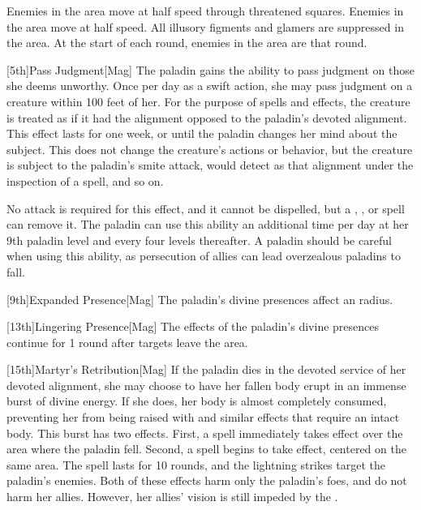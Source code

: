         Enemies in the area move at half speed through threatened squares.
        Enemies in the area move at half speed.
        All illusory figments and glamers are suppressed in the area.
        At the start of each round, enemies in the area are \immobilized that round.

        [5th]{Pass Judgment}[Mag]
        The paladin gains the ability to pass judgment on those she deems unworthy.
        Once per day as a swift action, she may pass judgment on a creature within 100 feet of her.
        For the purpose of spells and effects, the creature is treated as if it had the alignment opposed to the paladin's devoted alignment.
        This effect lasts for one week, or until the paladin changes her mind about the subject.
        This does not change the creature's actions or behavior, but the creature is subject to the paladin's smite attack, would detect as that alignment under the inspection of a  spell, and so on.

        No attack is required for this effect, and it cannot be dispelled, but a , , or  spell can remove it.
        The paladin can use this ability an additional time per day at her 9th paladin level and every four levels thereafter.
        A paladin should be careful when using this ability, as persecution of allies can lead overzealous paladins to fall.

        [9th]{Expanded Presence}[Mag]
        The paladin's divine presences affect an \arealarge radius.

        [13th]{Lingering Presence}[Mag]
        The effects of the paladin's divine presences continue for 1 round after targets leave the area.

        [15th]{Martyr's Retribution}[Mag]
        If the paladin dies in the devoted service of her devoted alignment, she may choose to have her fallen body erupt in an immense burst of divine energy.
        If she does, her body is almost completely consumed, preventing her from being raised with  and similar effects that require an intact body.
        This burst has two effects.
        First, a  spell immediately takes effect over the area where the paladin fell.
        Second, a  spell begins to take effect, centered on the same area.
        The spell lasts for 10 rounds, and the lightning strikes target the paladin's enemies.
        Both of these effects harm only the paladin's foes, and do not harm her allies.
        However, her allies' vision is still impeded by the .

